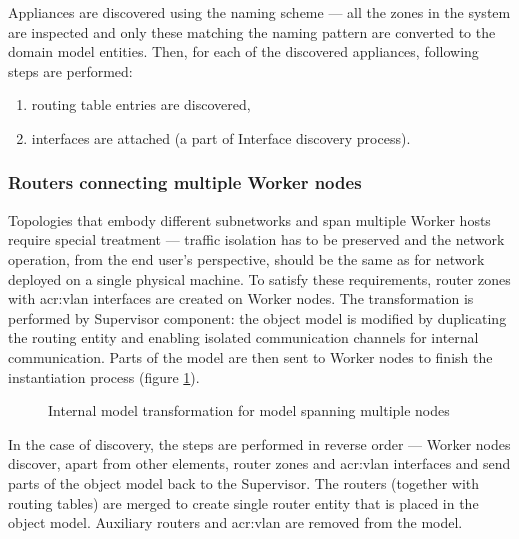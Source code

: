 \documentclass[11pt]{book}
\begin{document}
          Appliances are discovered using the naming scheme --- all the zones in the system are inspected and only these
          matching the naming pattern are converted to the domain model entities. Then, for each of the discovered
          appliances, following steps are performed:

          \begin{enumerate}
            \item routing table entries are discovered,
            \item interfaces are attached (a part of Interface discovery process).
          \end{enumerate}


        \subsubsection{Routers connecting multiple Worker nodes}

          Topologies that embody different subnetworks and span multiple Worker hosts require special treatment ---
          traffic isolation has to be preserved and the network operation, from the end user's perspective, should be
          the same as for network deployed on a single physical machine. To satisfy these requirements, router zones
          with \gls{acr:vlan} interfaces are created on Worker nodes. The transformation is performed by Supervisor
          component: the object model is modified by duplicating the routing entity and enabling isolated communication
          channels for internal communication. Parts of the model are then sent to Worker nodes to finish the
          instantiation process (figure \ref{fig:impl:router}).

          \begin{figure}[H]

            \centering

            \caption{Internal model transformation for model spanning multiple nodes}
            \label{fig:impl:router}
          
          \end{figure}

          In the case of discovery, the steps are performed in reverse order --- Worker nodes discover, apart from other
          elements, router zones and \gls{acr:vlan} interfaces and send parts of the object model back to the
          Supervisor. The routers (together with routing tables) are merged to create single router entity that is
          placed in the object model. Auxiliary routers and \gls{acr:vlan} are removed from the model.
\end{document}
